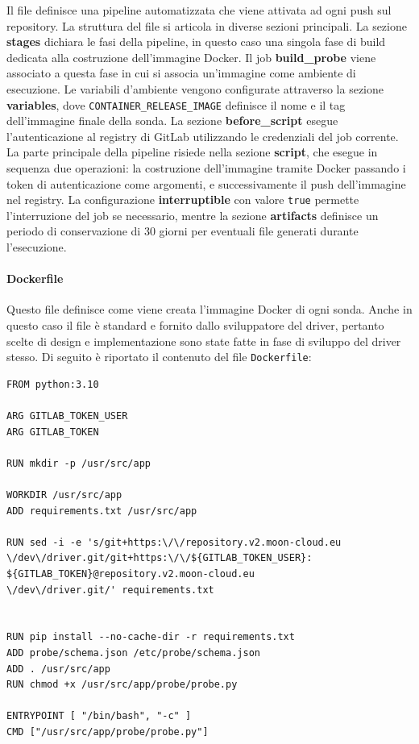 Il file definisce una pipeline automatizzata che viene attivata ad ogni push sul repository. La struttura del file si articola in diverse sezioni principali.
La sezione \textbf{stages} dichiara le fasi della pipeline, in questo caso una singola fase di build dedicata alla costruzione dell'immagine Docker. Il job \textbf{build\_probe} viene associato a questa fase in cui si associa un'immagine come ambiente di esecuzione.
Le variabili d'ambiente vengono configurate attraverso la sezione \textbf{variables}, dove \texttt{CONTAINER\_RELEASE\_IMAGE} definisce il nome e il tag dell'immagine finale della sonda. La sezione \textbf{before\_script} esegue l'autenticazione al registry di GitLab utilizzando le credenziali del job corrente.
La parte principale della pipeline risiede nella sezione \textbf{script}, che esegue in sequenza due operazioni: la costruzione dell'immagine tramite Docker passando i token di autenticazione come argomenti, e successivamente il push dell'immagine nel registry. La configurazione \textbf{interruptible} con valore \texttt{true} permette l'interruzione del job se necessario, mentre la sezione \textbf{artifacts} definisce un periodo di conservazione di 30 giorni per eventuali file generati durante l'esecuzione.

\paragraph{Dockerfile} Questo file definisce come viene creata l'immagine Docker di ogni sonda. Anche in questo caso il file è standard e fornito dallo sviluppatore del driver, pertanto scelte di design e implementazione sono state fatte in fase di sviluppo del driver stesso. Di seguito è riportato il contenuto del file \texttt{Dockerfile}:

\begin{lstlisting}[style=mydockerfile, caption={\texttt{Dockerfile} per la creazione dell'immagine della sonda}]
FROM python:3.10

ARG GITLAB_TOKEN_USER
ARG GITLAB_TOKEN

RUN mkdir -p /usr/src/app

WORKDIR /usr/src/app 
ADD requirements.txt /usr/src/app 

RUN sed -i -e 's/git+https:\/\/repository.v2.moon-cloud.eu
\/dev\/driver.git/git+https:\/\/${GITLAB_TOKEN_USER}:
${GITLAB_TOKEN}@repository.v2.moon-cloud.eu
\/dev\/driver.git/' requirements.txt


RUN pip install --no-cache-dir -r requirements.txt
ADD probe/schema.json /etc/probe/schema.json
ADD . /usr/src/app
RUN chmod +x /usr/src/app/probe/probe.py

ENTRYPOINT [ "/bin/bash", "-c" ]
CMD ["/usr/src/app/probe/probe.py"]
\end{lstlisting}

